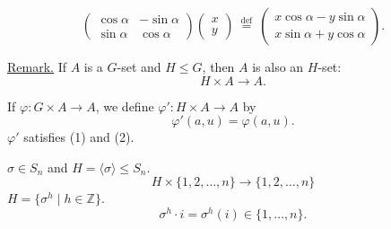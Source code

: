 \[
\begin{pmatrix}
\cos\alpha & -\sin\alpha\\
\sin\alpha & \cos\alpha
\end{pmatrix}
\begin{pmatrix}x\\y\end{pmatrix}
\ \overset{\mathrm{def}}{=}\
\begin{pmatrix}
x\cos\alpha-y\sin\alpha\\
x\sin\alpha+y\cos\alpha
\end{pmatrix}.
\]

\bigskip
\noindent\underline{Remark.} If $A$ is a $G$-set and $H\leq G$,
then $A$ is also an $H$-set:
\[
H\times A\longrightarrow A.
\]

\noindent If $\varphi:G\times A\longrightarrow A$, we define
$\varphi':H\times A\longrightarrow A$ by
\[
\varphi'(a,u)=\varphi(a,u).
\]
\noindent $\varphi'$ satisfies (1) and (2).

\bigskip
\noindent $\sigma\in S_n$ and $H=\langle\sigma\rangle\leq S_n$.
\[
H\times\{1,2,\ldots,n\}\longrightarrow\{1,2,\ldots,n\}
\]
\noindent $H=\{\sigma^h\mid h\in\mathbb{Z}\}$.
\[
\sigma^h\cdot i=\sigma^h(i)\in\{1,\ldots,n\}.
\]
